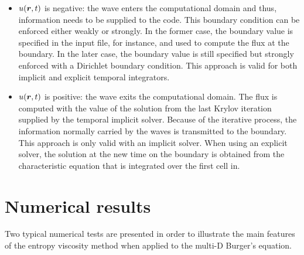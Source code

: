 \begin{itemize}
\item $u(\boldsymbol r,t) $ is negative: the wave enters the computational domain and thus, information needs to be supplied to the code. This boundary condition can be enforced either weakly or strongly. In the former case, the boundary value is specified in the input file, for instance, and used to compute the flux at the boundary. In the later case, the boundary value is still specified but strongly enforced with a Dirichlet boundary condition. This approach is valid for both implicit and explicit temporal integrators.
\item $u(\boldsymbol r,t) $ is positive: the wave exits the computational domain. The flux is computed with the value of the solution from the last Krylov iteration supplied by the temporal implicit solver. Because of the iterative process, the information normally carried by the waves is transmitted to the boundary. This approach is only valid with an implicit solver. When using an explicit solver, the solution at the new time on the boundary is obtained from the characteristic equation that is integrated over the first cell in.
\end{itemize}
%
\section{Numerical results}\label{sec:num_sct2b}
Two typical numerical tests are presented in order to illustrate the main features of the entropy viscosity method when applied to the multi-D Burger's equation.
